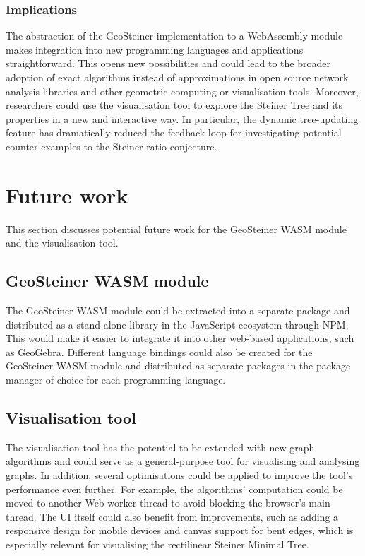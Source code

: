 \documentclass{l4proj}
\begin{document}
\subsubsection{Implications}
The abstraction of the GeoSteiner implementation to a WebAssembly module makes integration into new programming languages and applications straightforward. This opens new possibilities and could lead to the broader adoption of exact algorithms instead of approximations in open source network analysis libraries and other geometric computing or visualisation tools.
Moreover, researchers could use the visualisation tool to explore the Steiner Tree and its properties in a new and interactive way. In particular, the dynamic tree-updating feature has dramatically reduced the feedback loop for investigating potential counter-examples to the Steiner ratio conjecture.

\section{Future work}
This section discusses potential future work for the GeoSteiner WASM module and the visualisation tool.

\subsection{GeoSteiner WASM module}
The GeoSteiner WASM module could be extracted into a separate package and distributed as a stand-alone library in the JavaScript ecosystem through NPM. This would make it easier to integrate it into other web-based applications, such as GeoGebra. Different language bindings could also be created for the GeoSteiner WASM module and distributed as separate packages in the package manager of choice for each programming language.

\subsection{Visualisation tool}
The visualisation tool has the potential to be extended with new graph algorithms and could serve as a general-purpose tool for visualising and analysing graphs.
In addition, several optimisations could be applied to improve the tool's performance even further. For example, the algorithms' computation could be moved to another Web-worker thread to avoid blocking the browser's main thread.
The UI itself could also benefit from improvements, such as adding a responsive design for mobile devices and canvas support for bent edges, which is especially relevant for visualising the rectilinear Steiner Minimal Tree.
\end{document}
